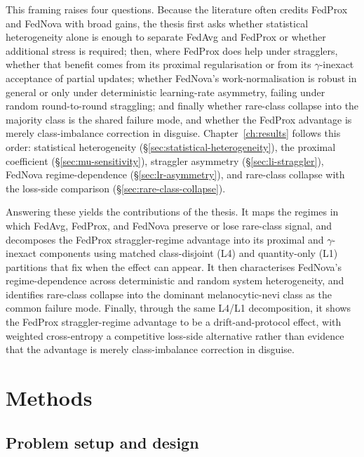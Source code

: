 \documentclass[11pt,a4paper]{report}
\begin{document}
This framing raises four questions. Because the literature often credits FedProx
and FedNova with broad gains, the thesis first asks whether statistical
heterogeneity alone is enough to separate FedAvg and FedProx or whether additional
stress is required; then, where FedProx does help under stragglers, whether that
benefit comes from its proximal regularisation or from its $\gamma$-inexact
acceptance of partial updates; whether FedNova's work-normalisation is robust in
general or only under deterministic learning-rate asymmetry, failing under random
round-to-round straggling; and finally whether rare-class collapse into the
majority class is the shared failure mode, and whether the FedProx advantage is
merely class-imbalance correction in disguise. Chapter~\ref{ch:results} follows
this order: statistical heterogeneity (\S\ref{sec:statistical-heterogeneity}), the
proximal coefficient (\S\ref{sec:mu-sensitivity}), straggler asymmetry
(\S\ref{sec:li-straggler}), FedNova regime-dependence (\S\ref{sec:lr-asymmetry}),
and rare-class collapse with the loss-side comparison
(\S\ref{sec:rare-class-collapse}).

Answering these yields the contributions of the thesis. It maps the regimes in
which FedAvg, FedProx, and FedNova preserve or lose rare-class signal, and
decomposes the FedProx straggler-regime advantage into its proximal and
$\gamma$-inexact components using matched class-disjoint (L4) and quantity-only
(L1) partitions that fix when the effect can appear. It then characterises
FedNova's regime-dependence across deterministic and random system heterogeneity,
and identifies rare-class collapse into the dominant melanocytic-nevi class as the
common failure mode. Finally, through the same L4/L1 decomposition, it shows the
FedProx straggler-regime advantage to be a drift-and-protocol effect, with
weighted cross-entropy a competitive loss-side alternative rather than evidence
that the advantage is merely class-imbalance correction in disguise.


\chapter{Methods}
\label{ch:methods}

\section{Problem setup and design}
\label{sec:method-problem}
\label{sec:method-rationale}
\end{document}
